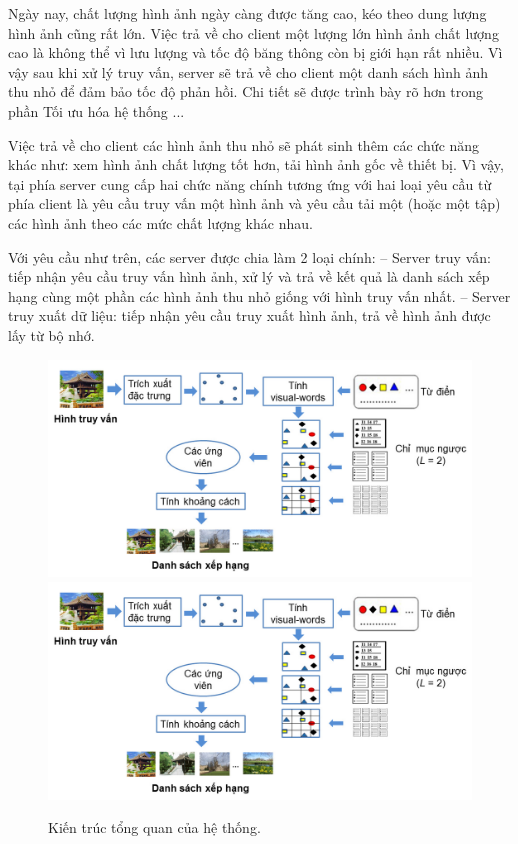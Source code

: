 Ngày nay, chất lượng hình ảnh ngày càng được tăng cao, kéo theo dung lượng hình ảnh cũng rất lớn. Việc trả về cho client một lượng lớn hình ảnh chất lượng cao là không thể vì lưu lượng và tốc độ băng thông còn bị giới hạn rất nhiều. Vì vậy sau khi xử lý truy vấn, server sẽ trả về cho client một danh sách hình ảnh thu nhỏ để đảm bảo tốc độ phản hồi. Chi tiết sẽ được trình bày rõ hơn trong phần Tối ưu hóa hệ thống ...

Việc trả về cho client các hình ảnh thu nhỏ sẽ phát sinh thêm các chức năng khác như: xem hình ảnh chất lượng tốt hơn, tải hình ảnh gốc về thiết bị. Vì vậy, tại phía server cung cấp hai chức năng chính tương ứng với hai loại yêu cầu từ phía client là yêu cầu truy vấn một hình ảnh và yêu cầu tải một (hoặc một tập) các hình ảnh theo các mức chất lượng khác nhau.

Với yêu cầu như trên, các server được chia làm 2 loại chính:
-- Server truy vấn: tiếp nhận yêu cầu truy vấn hình ảnh, xử lý và trả về kết quả là danh sách xếp hạng cùng một phần các hình ảnh thu nhỏ giống với hình truy vấn nhất.
-- Server truy xuất dữ liệu: tiếp nhận yêu cầu truy xuất hình ảnh, trả về hình ảnh được lấy từ bộ nhớ.


\begin{figure}[!htbp]
  \begin{center}
    \leavevmode
    \ifpdf
      \includegraphics[scale=0.14]{query-process-server}
    \else
      \includegraphics[scale=0.14]{query-process-server}
    \fi
    \caption[Kiến trúc tổng quan của hệ thống]{Kiến trúc tổng quan của hệ thống.}
    \label{query-process-server}
  \end{center}
\end{figure}

